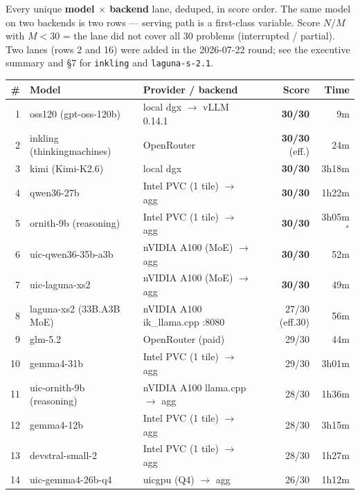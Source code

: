 \documentclass[11pt]{article}
\begin{document}
Every unique \textbf{model $\times$ backend} lane, deduped, in score order. The same
model on two backends is two rows --- serving path is a first-class variable. Score
$N/M$ with $M<30$ = the lane did not cover all 30 problems (interrupted / partial).
Two lanes (rows 2 and 16) were added in the 2026-07-22 round; see the executive
summary and \S7 for \texttt{inkling} and \texttt{laguna-s-2.1}.

{\footnotesize
\begin{longtable}{@{}rp{4.7cm}p{4.3cm}rr@{}}
\toprule
\# & \textbf{Model} & \textbf{Provider / backend} & \textbf{Score} & \textbf{Time} \\
\midrule
\endhead
1  & oss120 (gpt-oss-120b)            & local dgx $\to$ vLLM 0.14.1   & \textbf{30/30} & 9m \\
2  & inkling (thinkingmachines)       & OpenRouter                         & \textbf{30/30} (eff.) & 24m \\
3  & kimi (Kimi-K2.6)                 & local dgx                        & \textbf{30/30} & 3h18m \\
4  & qwen36-27b                       & Intel PVC (1 tile) $\to$ agg          & \textbf{30/30} & 1h22m \\
5  & ornith-9b (reasoning)            & Intel PVC (1 tile) $\to$ agg          & \textbf{30/30} & 3h05m$^{*}$ \\
6  & uic-qwen36-35b-a3b               & nVIDIA A100 (MoE) $\to$ agg                   & \textbf{30/30} & 52m \\
7  & uic-laguna-xs2                   & nVIDIA A100 (MoE) $\to$ agg                   & \textbf{30/30} & 49m \\
8  & laguna-xs2 (33B.A3B MoE)         & nVIDIA A100 ik\_llama.cpp :8080& 27/30 (eff.30) & 56m \\
9  & glm-5.2                          & OpenRouter (paid)                  & 29/30       & 44m \\
10 & gemma4-31b                       & Intel PVC (1 tile) $\to$ agg          & 29/30       & 3h01m \\
11 & uic-ornith-9b (reasoning)        & nVIDIA A100 llama.cpp $\to$ agg  & 28/30       & 1h36m \\
12 & gemma4-12b                       & Intel PVC (1 tile) $\to$ agg          & 28/30       & 3h15m \\
13 & devstral-small-2                 & Intel PVC (1 tile) $\to$ agg          & 28/30       & 1h27m \\
14 & uic-gemma4-26b-q4                & uicgpu (Q4) $\to$ agg              & 26/30       & 1h12m \\

\end{longtable}}
\end{document}
